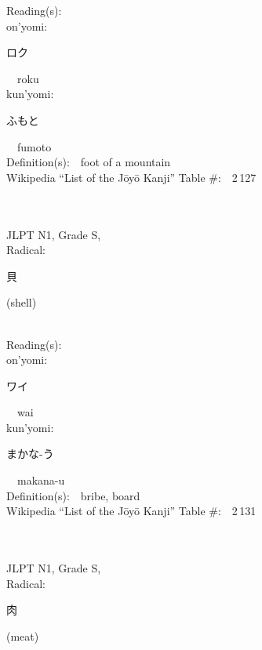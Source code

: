 \begin{multicols}{2}
Reading(s):\ \ \\
{\hspace*{1em}}on'yomi:\ \ \\
{\hspace*{2em}}{\begin{CJK}{UTF8}{min} ロク \end{CJK}}\ \ roku\ \ \\
{\hspace*{1em}}kun'yomi:\ \ \\
{\hspace*{2em}}{\begin{CJK}{UTF8}{min} ふもと \end{CJK}}\ \ fumoto\ \ \\
Definition(s):\ \ foot of a mountain \\
Wikipedia ``List of the J\=oy\=o Kanji'' Table \#:\ \ 2\,127 \\
\ \ \\
{\fontsize{34pt}{40pt}  }\ \ \\
{JLPT N1, Grade S, \\Radical:\ \ {\begin{CJK}{UTF8}{min} 貝 \end{CJK}} (shell) } \\
Reading(s):\ \ \\
{\hspace*{1em}}on'yomi:\ \ \\
{\hspace*{2em}}{\begin{CJK}{UTF8}{min} ワイ \end{CJK}}\ \ wai\ \ \\
{\hspace*{1em}}kun'yomi:\ \ \\
{\hspace*{2em}}{\begin{CJK}{UTF8}{min} まかな-う \end{CJK}}\ \ makana-u\ \ \\
Definition(s):\ \ bribe, board \\
Wikipedia ``List of the J\=oy\=o Kanji'' Table \#:\ \ 2\,131 \\
\ \ \\
{\fontsize{34pt}{40pt}  }\ \ \\
{JLPT N1, Grade S, \\Radical:\ \ {\begin{CJK}{UTF8}{min} 肉 \end{CJK}} (meat) } \\

\end{multicols}
